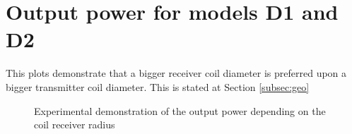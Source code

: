 \section{Output power for models D1 and D2}\label{D1D2}
This plots demonstrate that a bigger receiver coil diameter is preferred upon a bigger transmitter coil diameter. This is stated at Section \ref{subsec:geo}
\begin{figure}[H]
\centering
\begin{subfigmatrix}{2} 
\end{subfigmatrix}
\caption{Experimental demonstration of the output power depending on the coil receiver radius}
\end{figure}







